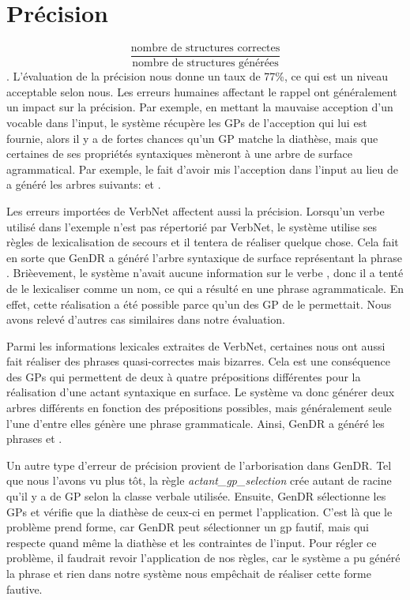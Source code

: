 \section{Précision}

\[\frac{\text{nombre de structures correctes}}{\text{nombre de structures générées}}\]. L'évaluation de la précision nous donne un taux de 77\%, ce qui est un niveau acceptable selon nous. Les erreurs humaines affectant le rappel ont généralement un impact sur la précision. Par exemple, en mettant la mauvaise acception d'un vocable dans l'input, le système récupère les \acp{GP} de l'acception qui lui est fournie, alors il y a de fortes chances qu'un \ac{GP} matche la diathèse, mais que certaines de ses propriétés syntaxiques mèneront à une arbre de surface agrammatical. Par exemple, le fait d'avoir mis l'acception  dans l'input au lieu de  a généré les arbres suivants:  et .

Les erreurs importées de VerbNet affectent aussi la précision. Lorsqu'un verbe utilisé dans l'exemple n'est pas répertorié par VerbNet, le système utilise ses règles de lexicalisation  de secours et il tentera de réaliser quelque chose. Cela fait en sorte que GenDR a généré l'arbre syntaxique de surface représentant la phrase . Brièevement, le système n'avait aucune information sur le verbe , donc il a tenté de le lexicaliser comme un nom, ce qui a résulté en une phrase agrammaticale. En effet, cette réalisation a été possible parce qu'un des \ac{GP} de  le permettait. Nous avons relevé d'autres cas similaires dans notre évaluation.

Parmi les informations lexicales extraites de VerbNet, certaines nous ont aussi fait réaliser des phrases quasi-correctes mais bizarres. Cela est une conséquence des \acp{GP} qui permettent de deux à quatre prépositions différentes pour la réalisation d'une actant syntaxique en surface. Le système va donc générer deux arbres différents en fonction des prépositions possibles, mais généralement seule l'une d'entre elles génère une phrase grammaticale. Ainsi, GenDR a généré les phrases  et \ungr{}.

Un autre type d'erreur de précision provient de l'arborisation dans GenDR. Tel que nous l'avons vu plus tôt, la règle \emph{actant\_gp\_selection} crée autant de racine qu'il y a de \ac{GP} selon la classe verbale utilisée. Ensuite, GenDR sélectionne les \acp{GP} et vérifie que la diathèse de ceux-ci en permet l'application. C'est là que le problème prend forme, car  GenDR peut sélectionner un gp fautif, mais qui respecte quand même la diathèse et les contraintes de l'input. Pour régler ce problème, il faudrait revoir l'application de nos règles, car le système a pu généré la phrase \ungr{} et rien dans notre système nous empêchait de réaliser cette forme fautive.